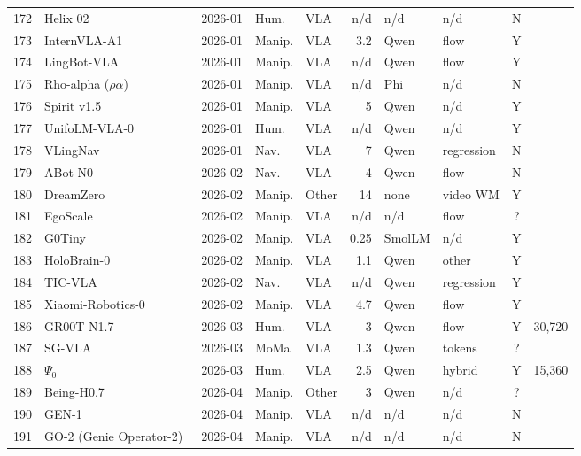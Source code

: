 \begin{longtable}{@{}r p{3.55cm} l l l r l l c r@{}}
172 & Helix 02~\cite{web-helix-02} & 2026-01 & Hum. & VLA & n/d & n/d & n/d & N & \\
173 & InternVLA-A1~\cite{ax260102456} & 2026-01 & Manip. & VLA & 3.2 & Qwen & flow & Y & \\
174 & LingBot-VLA~\cite{ax260118692} & 2026-01 & Manip. & VLA & n/d & Qwen & flow & Y & \\
175 & Rho-alpha ($\rho\alpha$)~\cite{web-rho-alpha} & 2026-01 & Manip. & VLA & n/d & Phi & n/d & N & \\
176 & Spirit v1.5~\cite{web-spirit-v1-5} & 2026-01 & Manip. & VLA & 5 & Qwen & n/d & Y & \\
177 & UnifoLM-VLA-0~\cite{web-unifolm-vla-0} & 2026-01 & Hum. & VLA & n/d & Qwen & n/d & Y & \\
178 & VLingNav~\cite{ax260108665} & 2026-01 & Nav. & VLA & 7 & Qwen & regression & N & \\
179 & ABot-N0~\cite{ax260211598} & 2026-02 & Nav. & VLA & 4 & Qwen & flow & N & \\
180 & DreamZero~\cite{ax260215922} & 2026-02 & Manip. & Other & 14 & none & video WM & Y & \\
181 & EgoScale~\cite{ax260216710} & 2026-02 & Manip. & VLA & n/d & n/d & flow & ? & \\
182 & G0Tiny~\cite{web-g0tiny} & 2026-02 & Manip. & VLA & 0.25 & SmolLM & n/d & Y & \\
183 & HoloBrain-0~\cite{ax260212062} & 2026-02 & Manip. & VLA & 1.1 & Qwen & other & Y & \\
184 & TIC-VLA~\cite{ax260202459} & 2026-02 & Nav. & VLA & n/d & Qwen & regression & Y & \\
185 & Xiaomi-Robotics-0~\cite{ax260212684} & 2026-02 & Manip. & VLA & 4.7 & Qwen & flow & Y & \\
186 & GR00T N1.7~\cite{web-gr00t-n1-7} & 2026-03 & Hum. & VLA & 3 & Qwen & flow & Y & 30,720\\
187 & SG-VLA~\cite{ax260322760} & 2026-03 & MoMa & VLA & 1.3 & Qwen & tokens & ? & \\
188 & $\Psi_0$~\cite{ax260312263} & 2026-03 & Hum. & VLA & 2.5 & Qwen & hybrid & Y & 15,360\\
189 & Being-H0.7~\cite{ax260500078} & 2026-04 & Manip. & Other & 3 & Qwen & n/d & ? & \\
190 & GEN-1~\cite{web-gen-1} & 2026-04 & Manip. & VLA & n/d & n/d & n/d & N & \\
191 & GO-2 (Genie Operator-2)~\cite{web-go-2} & 2026-04 & Manip. & VLA & n/d & n/d & n/d & N & \\

\end{longtable}
